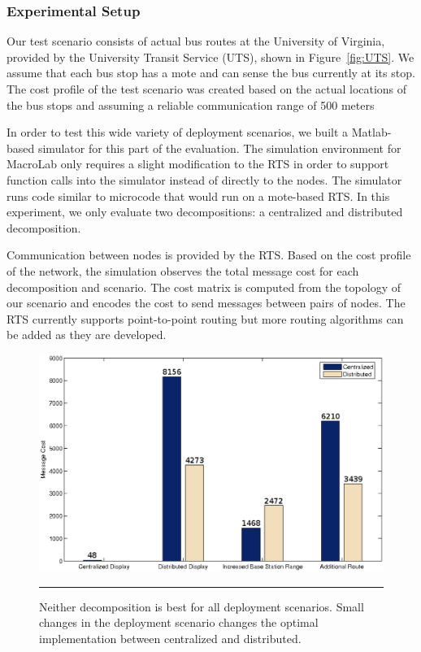 \subsubsection{Experimental Setup}\label{sect:setup}
Our test scenario consists of actual bus routes at the University of Virginia,
provided by the University Transit Service (UTS), shown in Figure~\ref{fig:UTS}.
We assume that each bus stop has a mote and can sense the bus currently at its
stop.  The cost profile of the test scenario was created based on the actual
locations of the bus stops and assuming a reliable communication range of 500 meters

In order to test this wide variety of deployment scenarios, we built a
Matlab-based simulator for this part of the evaluation.  The
simulation environment for MacroLab only requires a slight
modification to the RTS in order to support function calls into the
simulator instead of directly to the nodes.  The simulator runs code 
similar to microcode that would run on a mote-based RTS.  In this
experiment, we only evaluate two decompositions: a centralized and
distributed decomposition.

Communication between nodes is provided by the RTS. Based on the cost profile
of the network, the simulation observes the total message cost for each
decomposition and scenario.  The cost matrix is computed from the topology
of our scenario and encodes the cost to send messages between pairs of nodes.
The RTS currently supports point-to-point routing but more routing algorithms
can be added as they are developed.

\begin{figure}[t]
  \centering
  \includegraphics[width=1\columnwidth]{fig/scenarioSmall}
  \smallskip
  \hrule
  \caption[Effect of deployment scenario on efficient implementation]{Neither
    decomposition is best for all deployment scenarios. Small changes in the
    deployment scenario changes the optimal implementation between centralized
    and distributed.}
  \label{fig:MainResult}
\end{figure}

